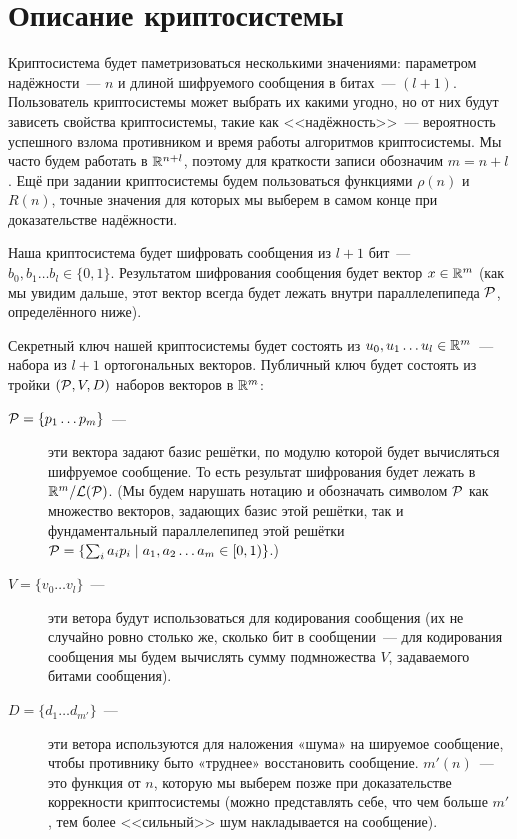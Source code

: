 \documentclass[oneside, a4paper]{article}
\theoremstyle{plain}
\theoremstyle{definition}
\theoremstyle{remark}
\newcommand\PP{\ensuremath \mathcal P}
\newcommand\LL{\ensuremath \mathcal L}
\newcommand\R{\ensuremath \mathbb R}
\begin{document}
\section{Описание криптосистемы}

Криптосистема будет паметризоваться несколькими значениями: параметром надёжности~--- $n$ и длиной шифруемого сообщения
в битах~--- $(l+1)$. Пользователь криптосистемы может выбрать их какими угодно, но от них будут зависеть свойства
криптосистемы, такие как <<надёжность>>~--- вероятность успешного взлома противником и время работы алгоритмов
криптосистемы. Мы часто будем работать в $\R^{n+l}$, поэтому для краткости записи обозначим $m = n + l$. Ещё при задании
криптосистемы будем пользоваться функциями $\rho(n)$ и $R(n)$, точные значения для которых мы выберем в самом конце при
доказательстве надёжности.

Наша криптосистема будет шифровать сообщения из $l+1$ бит~--- $b_0, b_1 \dots b_l \in \{0,1\}$. Результатом шифрования
сообщения будет вектор $x \in \R^m$ (как мы увидим дальше, этот вектор всегда будет лежать внутри параллелепипеда
$\PP$, определённого ниже).

Секретный ключ нашей криптосистемы будет состоять из $u_0, u_1 \dots u_l \in \R^m$~--- набора из $l+1$ ортогональных
векторов. Публичный ключ будет состоять из тройки $(\PP, V, D)$ наборов векторов в $\R^m$:
\begin{description}
\item[$\PP = \{p_1 \dots p_m\}$~---] эти вектора задают базис решётки, по модулю которой будет вычисляться шифруемое
сообщение. То есть результат шифрования будет лежать в $\R^m/\LL(\PP)$. (Мы будем нарушать нотацию и обозначать символом
$\PP$ как множество векторов, задающих базис этой решётки, так и фундаментальный параллелепипед этой решётки $\PP =
\left \{\sum_i a_i p_i \mid a_1, a_2 \dots a_m \in [0, 1) \right\}$.)
\item[$V = \{v_0 \dots v_l\}$~---] эти ветора будут использоваться для кодирования сообщения (их не случайно ровно
столько же, сколько бит в сообщении~--- для кодирования сообщения мы будем вычислять сумму подмножества $V$,
задаваемого битами сообщения).
\item[$D = \{d_1 \dots d_{m'}\}$~---] эти ветора используются для наложения «шума» на шируемое сообщение, чтобы
противнику быто «труднее» восстановить сообщение. $m'(n)$~--- это функция от $n$, которую мы выберем позже при
доказательстве коррекности криптосистемы (можно представлять себе, что чем больше $m'$, тем более <<сильный>> шум
накладывается на сообщение).
\end{description}
\end{document}
